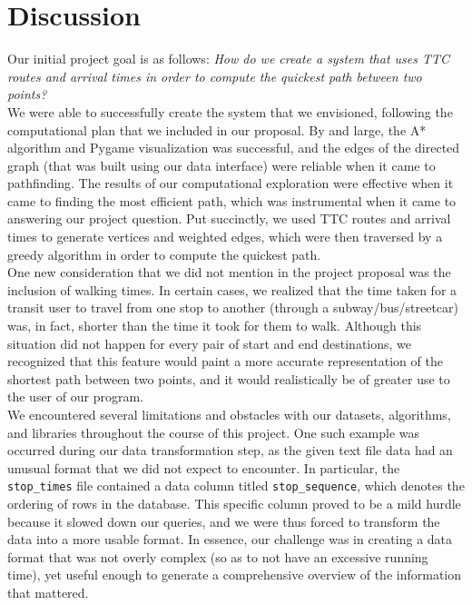 \documentclass[fontsize=11pt]{article}
\begin{document}
    \section*{Discussion}

    Our initial project goal is as follows: \emph{How do we create a system that uses TTC routes and arrival times in order to compute the quickest path between two points?} \\

    We were able to successfully create the system that we envisioned, following the computational plan that we included in our proposal. By and large, the A* algorithm and Pygame visualization was successful, and the edges of the directed graph (that was built using our data interface) were reliable when it came to pathfinding. The results of our computational exploration were effective when it came to finding the most efficient path, which was instrumental when it came to answering our project question. Put succinctly, we used TTC routes and arrival times to generate vertices and weighted edges, which were then traversed by a greedy algorithm in order to compute the quickest path. \\

    One new consideration that we did not mention in the project proposal was the inclusion of walking times. In certain cases, we realized that the time taken for a transit user to travel from one stop to another (through a subway/bus/streetcar) was, in fact, shorter than the time it took for them to walk. Although this situation did not happen for every pair of start and end destinations, we recognized that this feature would paint a more accurate representation of the shortest path between two points, and it would realistically be of greater use to the user of our program. \\

    We encountered several limitations and obstacles with our datasets, algorithms, and libraries throughout the course of this project. One such example was occurred during our data transformation step, as the given text file data had an unusual format that we did not expect to encounter. In particular, the \texttt{stop\_times} file contained a data column titled \texttt{stop\_sequence}, which denotes the ordering of rows in the database. This specific column proved to be a mild hurdle because it slowed down our queries, and we were thus forced to transform the data into a more usable format. In essence, our challenge was in creating a data format that was not overly complex (so as to not have an excessive running time), yet useful enough to generate a comprehensive overview of the information that mattered. \\
\end{document}
